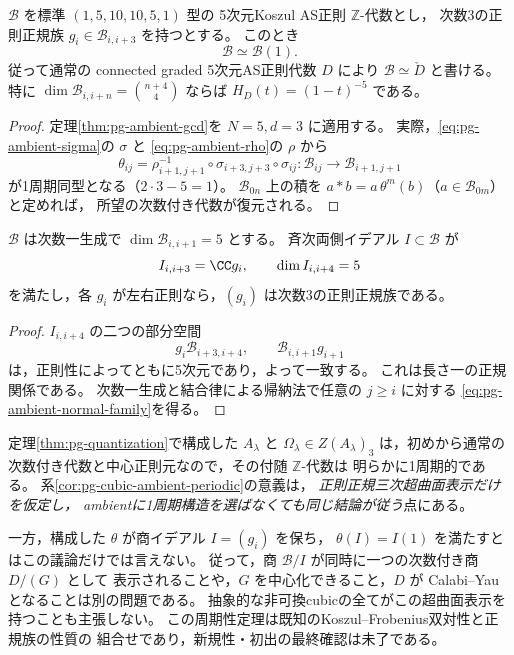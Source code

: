 \begin{corollary}\label{cor:pg-cubic-ambient-periodic}
$\mathcal B$ を標準 $(1,5,10,10,5,1)$ 型の
5次元Koszul AS正則 $\mathbb Z$-代数とし，
次数3の正則正規族 $g_i\in\mathcal B_{i,i+3}$ を持つとする。
このとき
\begin{equation}
 \mathcal B\simeq\mathcal B(1).
\end{equation}
従って通常の connected graded 5次元AS正則代数 $D$ により
$\mathcal B\simeq\check D$ と書ける。
特に $\dim\mathcal B_{i,i+n}=\binom{n+4}{4}$ ならば
$H_D(t)=(1-t)^{-5}$ である。
\end{corollary}
\begin{proof}
定理\ref{thm:pg-ambient-gcd}を $N=5,d=3$ に適用する。
実際，\eqref{eq:pg-ambient-sigma}の $\sigma$ と
\eqref{eq:pg-ambient-rho}の $\rho$ から
\begin{equation}
 \theta_{ij}=
 \rho^{-1}_{i+1,j+1}\circ
 \sigma_{i+3,j+3}\circ\sigma_{ij}:
 \mathcal B_{ij}\longrightarrow\mathcal B_{i+1,j+1}
\end{equation}
が1周期同型となる（$2\cdot3-5=1$）。
$\mathcal B_{0n}$ 上の積を
$a*b=a\,\theta^m(b)$（$a\in\mathcal B_{0m}$）と定めれば，
所望の次数付き代数が復元される。
\end{proof}

\begin{proposition}[低次数の核からの正規性判定]\label{prop:pg-cubic-normal-criterion}
$\mathcal B$ は次数一生成で
$\dim\mathcal B_{i,i+1}=5$ とする。
斉次両側イデアル $I\subset\mathcal B$ が
\begin{equation}
 I_{i,i+3}=\CC g_i,\qquad \dim I_{i,i+4}=5
\end{equation}
を満たし，各 $g_i$ が左右正則なら，$(g_i)$ は次数3の正則正規族である。
\end{proposition}
\begin{proof}
$I_{i,i+4}$ の二つの部分空間
\begin{equation}
 g_i\mathcal B_{i+3,i+4},
 \qquad \mathcal B_{i,i+1}g_{i+1}
\end{equation}
は，正則性によってともに5次元であり，よって一致する。
これは長さ一の正規関係である。
次数一生成と結合律による帰納法で任意の $j\geq i$ に対する
\eqref{eq:pg-ambient-normal-family}を得る。
\end{proof}

\begin{remark}[適用範囲と既知結果との関係]\label{rem:pg-ambient-pair-scope}
定理\ref{thm:pg-quantization}で構成した $A_\lambda$ と
$\Omega_\lambda\in Z(A_\lambda)_3$ は，初めから通常の
次数付き代数と中心正則元なので，その付随 $\mathbb Z$-代数は
明らかに1周期的である。
系\ref{cor:pg-cubic-ambient-periodic}の意義は，
\emph{正則正規三次超曲面表示だけを仮定し，
ambientに1周期構造を選ばなくても同じ結論が従う}点にある。

一方，構成した $\theta$ が商イデアル $I=(g_i)$ を保ち，
$\theta(I)=I(1)$ を満たすとはこの議論だけでは言えない。
従って，商 $\mathcal B/I$ が同時に一つの次数付き商 $D/(G)$ として
表示されることや，$G$ を中心化できること，$D$ が
Calabi--Yauとなることは別の問題である。
抽象的な非可換cubicの全てがこの超曲面表示を持つことも主張しない。
この周期性定理は既知のKoszul--Frobenius双対性と正規族の性質の
組合せであり，新規性・初出の最終確認は未了である。
\end{remark}
